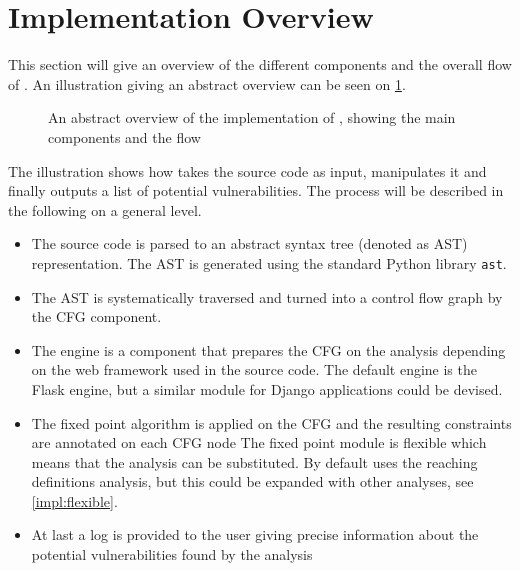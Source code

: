 \section{Implementation Overview}\label{impl:overview}
This section will give an overview of the different components and the overall flow of \pyt{}.
An illustration giving an abstract overview can be seen on \cref{figure:implementation_overview}.

\begin{figure}
  
  \caption{An abstract overview of the implementation of \pyt{}, showing the main components and the flow}
  \label{figure:implementation_overview}
\end{figure}

The illustration shows how  \pyt{} takes the source code as input, manipulates it and finally outputs a list of potential vulnerabilities.
The process will be described in the following on a general level.

\begin{itemize}
\item The source code is parsed to an abstract syntax tree (denoted as AST) representation.
  The AST is generated using the standard Python library \texttt{ast}\cite{python_ast}. 
\item The AST is systematically traversed and turned into a control flow graph by the CFG component.
\item The engine is a component that prepares the CFG on the analysis depending on the web framework used in the source code.
  The default engine is the Flask engine, but a similar module for Django applications could be devised.
\item The fixed point algorithm is applied on the CFG and the resulting constraints are annotated on each CFG node
  The fixed point module is flexible which means that the analysis can be substituted.
  By default \pyt{} uses the reaching definitions analysis, but this could be expanded with other analyses, see \cref{impl:flexible}.
\item At last a log is provided to the user giving precise information about the potential vulnerabilities found by the analysis
\end{itemize}
